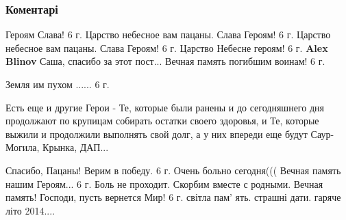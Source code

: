  
 
 
 
 
\subsubsection{Коментарі}

\begin{itemize} %
Героям Слава!
6 г.
Царство небесное вам пацаны. Слава Героям!
6 г.
Царство небесное вам пацаны. Слава Героям!
6 г.
Царство Небесне героям!
6 г.
\textbf{Alex Blinov} Саша, спасибо за этот пост...
Вечная память погибшим воинам!
6 г.

Земля им пухом ......
6 г.

Есть еще и другие Герои - Те, которые были ранены и до сегодняшнего дня
продолжают по крупицам собирать остатки своего здоровья, и Те, которые выжили и
продолжили выполнять свой долг, а у них впереди еще будут Саур-Могила, Крынка,
ДАП...

Спасибо, Пацаны!
Верим в победу.
6 г.
Очень больно сегодня((( Вечная память нашим Героям...
6 г.
Боль не проходит. Скорбим вместе с родными. Вечная память! Господи, пусть вернется Мир!
6 г.
світла пам' ять.
страшні дати.
гаряче літо 2014....
\end{itemize} %
